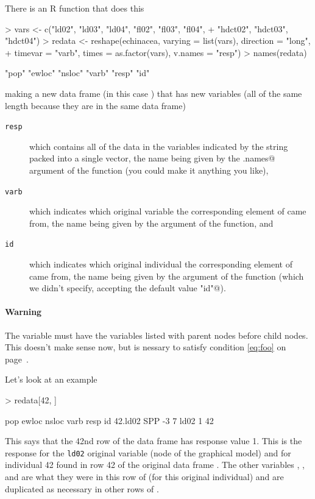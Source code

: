 \documentclass[11pt]{article}
\begin{document}
There is an R function \verb@reshape@ that does this
\begin{Schunk}
\begin{Sinput}
> vars <- c("ld02", "ld03", "ld04", "fl02", "fl03", "fl04", 
+     "hdct02", "hdct03", "hdct04")
> redata <- reshape(echinacea, varying = list(vars), direction = "long", 
+     timevar = "varb", times = as.factor(vars), v.names = "resp")
> names(redata)
\end{Sinput}
\begin{Soutput}
[1] "pop"   "ewloc" "nsloc" "varb"  "resp"  "id"   
\end{Soutput}
\end{Schunk}
making a new data frame (in this case \verb@redata@) that has new
variables (all of the same length because they are in the same data frame)
\begin{description}
\item[\normalfont \texttt{resp}] which contains all of the data in the
variables indicated by the string \verb@vars@ packed into a single vector, the
name \verb@resp@ being given by the \verb@v.names@ argument of the
\verb@reshape@ function (you could make it anything you like),
\item[\normalfont \texttt{varb}] which indicates which original variable the
corresponding
element of \verb@resp@ came from, the name being given by the \verb@timevar@
argument of the \verb@reshape@ function, and
\item[\normalfont \texttt{id}] which indicates which original individual the
corresponding
element of \verb@resp@ came from, the name being given by the \verb@idvar@
argument of the \verb@reshape@ function (which we didn't specify, accepting
the default value \verb@"id"@).
\end{description}

\paragraph{Warning} The variable \verb@vars@ must have the variables
listed with parent nodes before child nodes.  This doesn't make sense
now, but is nessary to satisfy condition \eqref{eq:foo}
on page~\pageref{eq:foo}.

\medskip
Let's look at an example
\begin{Schunk}
\begin{Sinput}
> redata[42, ]
\end{Sinput}
\begin{Soutput}
        pop ewloc nsloc varb resp id
42.ld02 SPP    -3     7 ld02    1 42
\end{Soutput}
\end{Schunk}
This says that the 42nd row of the data frame \verb@redata@ has response
value 1.  This is the response for the
\texttt{ld02} original variable
(node of the graphical model)
and for individual 42 found
in row 42
of the original data frame \verb@echinacea@.  The other variables \verb@pop@,
\verb@ewloc@, and \verb@nsloc@ are what they were in this row
of \verb@echinacea@
(for this original individual) and are duplicated as necessary in other
rows of \verb@redata@.
\end{document}
